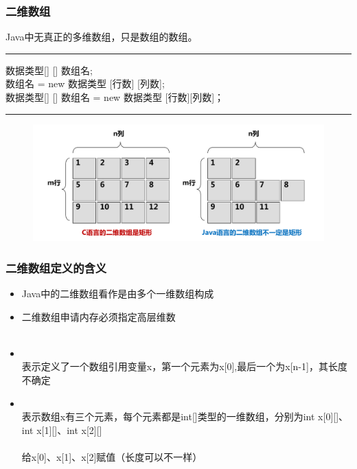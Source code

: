 \begin{frame}[fragile]
  \frametitle{二维数组}

  Java中无真正的多维数组，只是数组的数组。


  \rule[0pt]{10cm}{0.05em}

  {\kai 数据类型[] [] 数组名;\\
  数组名 = new 数据类型 [行数] [列数];\\
  数据类型[] [] 数组名 = new 数据类型 [行数][列数]；
  }
  
  \rule[0pt]{10cm}{0.05em}

  \begin{figure}
    \centering
    \includegraphics[width=.8\textwidth]{ppt/2-dim-array.pdf}
  \end{figure}
\end{frame}

\begin{frame}[fragile]
  \frametitle{二维数组定义的含义}
  \begin{itemize}[<+-| structure@+>]
  \item Java中的二维数组看作是由多个一维数组构成
  \item 二维数组申请内存必须指定{\Red 高层维数}\\
    \\
  \item {}\\
    {\kai\Blue 表示定义了一个数组引用变量x，第一个元素为x[0],最后一个为x[n-1]，其长度不确定}
  \item {}\\
    {\kai\Blue 表示数组x有三个元素，每个元素都是int[]类型的一维数组，分别为int x[0][]、int x[1][]、int x[2][]}\\
    \\
    {\kai\Blue 给x[0]、x[1]、x[2]赋值（长度可以不一样）}
  \end{itemize}
\end{frame}

